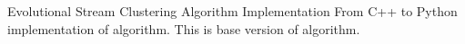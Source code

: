 Evolutional Stream Clustering Algorithm Implementation From C++ to Python implementation of algorithm. This is base version of algorithm. 